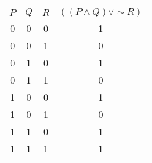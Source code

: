 \begin{tabular}{|c|c|c||c|}
\hline
$ P $ & $ Q $ & $ R $ & $ ((P \wedge Q) \vee  \sim R) $ \\
\hline
0 & 0 & 0 & 1 \\
0 & 0 & 1 & 0 \\
0 & 1 & 0 & 1 \\
0 & 1 & 1 & 0 \\
1 & 0 & 0 & 1 \\
1 & 0 & 1 & 0 \\
1 & 1 & 0 & 1 \\
1 & 1 & 1 & 1 \\
\hline
\end{tabular}
\label{table:tt1}
